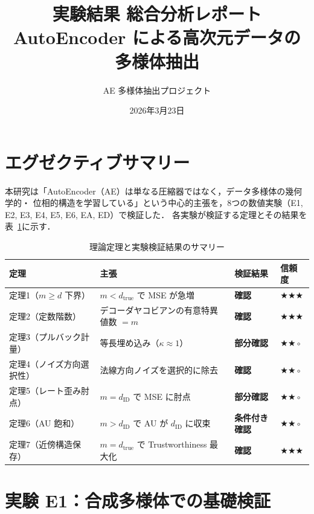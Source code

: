 \documentclass[12pt,a4paper]{ltjsarticle}  %
\title{
  \Large\textbf{実験結果 総合分析レポート}\\[0.5em]
  \large AutoEncoder による高次元データの多様体抽出
}
\author{AE 多様体抽出プロジェクト}
\date{2026年3月23日}
\newcommand{\dtrue}{d_{\mathrm{true}}}
\newcommand{\dID}{d_{\mathrm{ID}}}
\newcommand{\confirmed}{\textcolor{green!60!black}{\textbf{確認}}}
\newcommand{\partialconf}{\textcolor{orange!80!black}{\textbf{部分確認}}}
\newcommand{\conditional}{\textcolor{blue!70!black}{\textbf{条件付き確認}}}
\begin{document}
\maketitle
\tableofcontents
\newpage

\section{エグゼクティブサマリー}

本研究は「AutoEncoder（AE）は単なる圧縮器ではなく，データ多様体の幾何学的・
位相的構造を学習している」という中心的主張を，8つの数値実験（E1, E2, E3,
E4, E5, E6, EA, ED）で検証した．
各実験が検証する定理とその結果を表~\ref{tab:summary}に示す．

\begin{table}[H]
  \centering
  \caption{理論定理と実験検証結果のサマリー}
  \label{tab:summary}
  \renewcommand{\arraystretch}{1.3}
  \begin{tabular}{llll}
    \toprule
    定理 & 主張 & 検証結果 & 信頼度 \\
    \midrule
    定理1（$m \geq d$ 下界）
      & $m < \dtrue$ で MSE が急増
      & \confirmed & $\bigstar\bigstar\bigstar$ \\
    定理2（定数階数）
      & デコーダヤコビアンの有意特異値数 $= m$
      & \confirmed & $\bigstar\bigstar\bigstar$ \\
    定理3（プルバック計量）
      & 等長埋め込み（$\kappa \approx 1$）
      & \partialconf & $\bigstar\bigstar\circ$ \\
    定理4（ノイズ方向選択性）
      & 法線方向ノイズを選択的に除去
      & \confirmed & $\bigstar\bigstar\circ$ \\
    定理5（レート歪み肘点）
      & $m = \dID$ で MSE に肘点
      & \partialconf & $\bigstar\bigstar\circ$ \\
    定理6（AU 飽和）
      & $m > \dID$ で AU が $\dID$ に収束
      & \conditional & $\bigstar\bigstar\circ$ \\
    定理7（近傍構造保存）
      & $m = \dtrue$ で Trustworthiness 最大化
      & \confirmed & $\bigstar\bigstar\bigstar$ \\
    \bottomrule
  \end{tabular}
\end{table}

\section{実験 E1：合成多様体での基礎検証}
\end{document}
